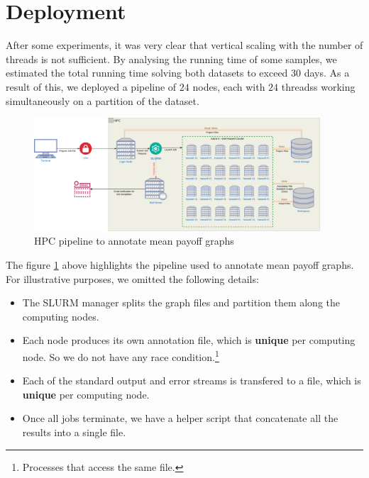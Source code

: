 \section{Deployment}
After some experiments, it was very clear that vertical scaling with the number of threads is not sufficient. By analysing the running time of some samples, we estimated the total running time solving both datasets to exceed $30$ days.
\newline As a result of this, we deployed a pipeline of $24$ nodes, each with $24$ threadss working simultaneously on a partition of the dataset.
\begin{figure}
	\centering
	\includegraphics[width=0.95\textwidth]{Figures/DatasetAnnotation.png}
	\caption{HPC pipeline to annotate mean payoff graphs
	\label{fig:HPCAnnotation}}
\end{figure}
\FloatBarrier
The figure \ref{fig:HPCAnnotation} above highlights the pipeline used to annotate mean payoff graphs.
\newline For illustrative purposes, we omitted the following details:
\begin{itemize}
	\item The SLURM manager splits the graph files and partition them along the computing nodes.
	\item Each node produces its own annotation file, which is \textbf{unique} per computing node. So we do not have any race condition.\footnote{Processes that access the same file.} 
	\item Each of the standard output and error streams is transfered to a file, which is \textbf{unique} per computing node.
	\item Once all jobs terminate, we have a helper script that concatenate all the results into a single file.
\end{itemize} 

